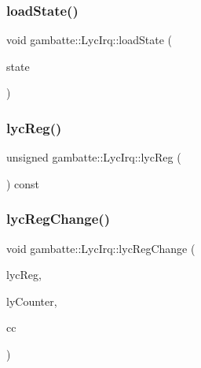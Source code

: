 \mbox{\label{classgambatte_1_1LycIrq_a3dbcaa80af33a03f83be90bfb8d9c63d}} 
\subsubsection{\texorpdfstring{load\+State()}{loadState()}}
{\footnotesize\ttfamily void gambatte\+::\+Lyc\+Irq\+::load\+State (\begin{DoxyParamCaption}\item[{\hyperlink{structgambatte_1_1SaveState}{Save\+State} const \&}]{state }\end{DoxyParamCaption})}

\mbox{\label{classgambatte_1_1LycIrq_aa0c87be5b827d0a1bf9ed54e5e8e0786}} 
\subsubsection{\texorpdfstring{lyc\+Reg()}{lycReg()}}
{\footnotesize\ttfamily unsigned gambatte\+::\+Lyc\+Irq\+::lyc\+Reg (\begin{DoxyParamCaption}{ }\end{DoxyParamCaption}) const\hspace{0.3cm}{\ttfamily [inline]}}

\mbox{\label{classgambatte_1_1LycIrq_a5c8dd6fee0a1ce846964d06a08a06dec}} 
\subsubsection{\texorpdfstring{lyc\+Reg\+Change()}{lycRegChange()}}
{\footnotesize\ttfamily void gambatte\+::\+Lyc\+Irq\+::lyc\+Reg\+Change (\begin{DoxyParamCaption}\item[{unsigned}]{lyc\+Reg,  }\item[{\hyperlink{classgambatte_1_1LyCounter}{Ly\+Counter} const \&}]{ly\+Counter,  }\item[{unsigned}]{cc }\end{DoxyParamCaption})\hspace{0.3cm}{\ttfamily [inline]}}

